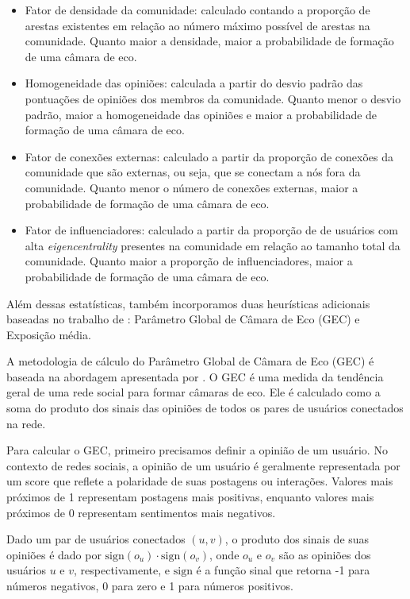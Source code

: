 \begin{itemize}
	\item Fator de densidade da comunidade: calculado contando a proporção de arestas existentes em relação ao número máximo possível de arestas na comunidade. Quanto maior a densidade, maior a probabilidade de formação de uma câmara de eco.
	\item Homogeneidade das opiniões: calculada a partir do desvio padrão das pontuações de opiniões dos membros da comunidade. Quanto menor o desvio padrão, maior a homogeneidade das opiniões e maior a probabilidade de formação de uma câmara de eco.
	\item Fator de conexões externas: calculado a partir da proporção de conexões da comunidade que são externas, ou seja, que se conectam a nós fora da comunidade. Quanto menor o número de conexões externas, maior a probabilidade de formação de uma câmara de eco.
	\item Fator de influenciadores: calculado a partir da proporção de de usuários com alta \textit{eigencentrality} presentes na comunidade em relação ao tamanho total da comunidade. Quanto maior a proporção de influenciadores, maior a probabilidade de formação de uma câmara de eco.
\end{itemize}

Além dessas estatísticas, também incorporamos duas heurísticas adicionais baseadas no trabalho de : Parâmetro Global de Câmara de Eco (GEC) e Exposição média.

A metodologia de cálculo do Parâmetro Global de Câmara de Eco (GEC) é baseada na abordagem apresentada por . O GEC é uma medida da tendência geral de uma rede social para formar câmaras de eco. Ele é calculado como a soma do produto dos sinais das opiniões de todos os pares de usuários conectados na rede.

Para calcular o GEC, primeiro precisamos definir a opinião de um usuário. No contexto de redes sociais, a opinião de um usuário é geralmente representada por um score que reflete a polaridade de suas postagens ou interações. Valores mais próximos de 1 representam postagens mais positivas, enquanto valores mais próximos de 0 representam sentimentos mais negativos.

Dado um par de usuários conectados $(u, v)$, o produto dos sinais de suas opiniões é dado por $\text{sign}(o_u) \cdot \text{sign}(o_v)$, onde $o_u$ e $o_v$ são as opiniões dos usuários $u$ e $v$, respectivamente, e $\text{sign}$ é a função sinal que retorna -1 para números negativos, 0 para zero e 1 para números positivos.

